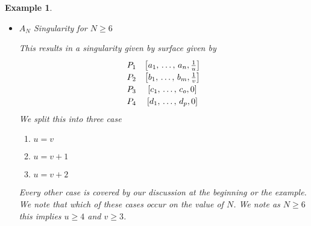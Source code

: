 \documentclass[12pt]{amsart}
\theoremstyle{plain}
\newtheorem{ex}[thm]{Example}
\begin{document}
\begin{ex}
\begin{itemize}
The final case is 
\[\def\arraystretch{1.2}
\begin{array}{cc}
P_1 & \left[ a_1, \, \dots , \, a_n, \frac{1}{3} \right] \\ 
P_2 & \left[b_1 , \, \dots, \, b_m, \frac{1}{3} \right] \\
P_3 & \left[c_1, \, \dots, \, c_o, 0\right] \\
P_4 & \left[d_1, \, \dots, \, d_p, 0\right]  \\
\end{array}
\]
This leads to a lot more cases, as follows. Once again possible choices for $P_1$ and $P_2$ are $\left[ 0, \, \frac{1}{3} \right]$ or $\left[ \frac{1}{3} \right]$. Once again denoting these by case $a$ and case $b$. In case $a$ it needs to connect to a point with denominator $ u \in \{2, \, 5, \, 8 \dots \}$, however it is impossible to construct any of these denominators, so this does no occur. In the case $b$, we either have the $A_1$ singularity with coordinates $(1, 3),\, (-1, -1)$ or the $A_2$ singularity given by $(1, 3),\, (-2, -3)$, other values result in non compatible denominators. If we had the singularity given by $(1, 3),\, (-1, -1)$, then the polyhedral divisor over $P_2$ would have to be $\left[ 0, \frac{1}{3} \right]$ which we have already shown cannot occur. If we have the $A_2$ singularity then this involves the only way this can be constructed is via 
\[
\left[\frac{1}{3} \right] \otimes P_1 + \left[\frac{1}{3} \right] \otimes P_2 + [0, -\, 1] \otimes P_3
\]
This finishes the $A_5$ case.

\item \begin{bf} $A_N$ Singularity for $N \geq 6$ \end{bf}

This results in a singularity given by surface given by 
\[\def\arraystretch{1.2}
\begin{array}{cc}
P_1 & \left[ a_1, \, \dots , \, a_n, \frac{1}{u} \right] \\ 
P_2 & \left[b_1 , \, \dots, \, b_m, \frac{1}{v} \right] \\
P_3 & \left[c_1, \, \dots, \, c_o, 0\right] \\
P_4 & \left[d_1, \, \dots, \, d_p, 0\right]  \\
\end{array}
\]
We split this into three case 
\begin{enumerate}[label =\alph*)]
\item $u = v$
\item $u = v + 1$
\item $u = v + 2$
\end{enumerate}
Every other case is covered by our discussion at the beginning or the example. We note that which of these cases occur on the value of $N$. We note as $N \geq 6$ this implies $u \geq 4$ and $v \geq 3$.


\end{itemize}
\end{ex}
\end{document}
